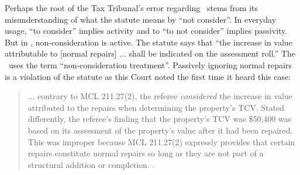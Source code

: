 



Perhaps the root of the Tax Tribunal's error regarding \mathieuGast\ stems from its misunderstanding of what the statute means by ``not consider''. In everyday usage, ``to consider'' implies activity and to ``to not consider'' implies passivity. But in \mathieuGast, non-consideration is active. The statute says that ``the increase in value attributable to [normal repairs] ... shall be indicated on the assessment roll.'' The \cite[s]{STC Bulletin}\ uses the term ``non-consideration treatment''. Passively ignoring normal repairs is a violation of the statute as this Court noted the first time it heard this case:

\begin{quote}
... contrary to MCL 211.27(2), the referee \textit{considered} the increase in value attributed to the repairs when determining the property's TCV. Stated differently, the referee's finding that the property's TCV was \$50,400 was based on its assessment of the property's value after it had been repaired. This was improper because MCL 211.27(2) expressly provides that certain repairs constitute normal repairs so long as they are not part of a structural addition or completion. .
\end{quote}

